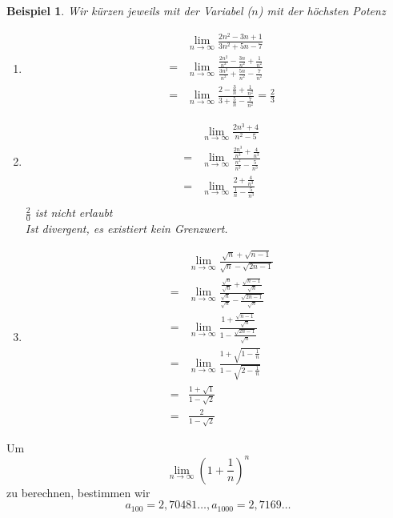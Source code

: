 \documentclass{report}
\newtheorem{myexample}{Beispiel}
\begin{document}
\newpage
\begin{myexample}Wir kürzen jeweils mit der Variabel ($n$) mit der höchsten Potenz
\begin{enumerate}
	\item 
	\begin{eqnarray*}
		&&\lim_{n \to \infty} \frac{2n^2-3n+1}{3n^2+5n-7} \\
		&=& \lim_{n \to \infty}\frac{\frac{2n^2}{n^2}-\frac{3n}{n^2}+\frac{1}{n^2}}{\frac{3n^2}{n^2}+\frac{5n}{n^2}-\frac{7}{n^2}} \\
		&=& \lim_{n \to \infty}\frac{2-\frac{3}{n}+\frac{1}{n^2}}{3+\frac{5}{n}-\frac{7}{n^2}} = \frac{2}{3}
	\end{eqnarray*}
	\item
	\begin{eqnarray*}
		&&\lim_{n \to \infty} \frac{2n^3+4}{n^2-5}\\
		&=&\lim_{n \to \infty} \frac{\frac{2n^3}{n^3}+ \frac{4}{n^3}}{\frac{n^2}{n^3}-\frac{5}{n^3}}\\
		&=&\lim_{n \to \infty} \frac{2+ \frac{4}{n^3}}{\frac{1}{n}-\frac{5}{n^3}}\\
	\end{eqnarray*}
	$\frac{2}{0}$ ist nicht erlaubt\\
	Ist divergent, es existiert kein Grenzwert. 
	\item \begin{eqnarray*}
	&&\lim_{n \to \infty}\frac{\sqrt{n}+\sqrt{n-1}}{\sqrt{n}-\sqrt{2n-1}} \\
	& = & \lim_{n \to \infty}\frac{\frac{\sqrt{n}}{\sqrt{n}}+\frac{\sqrt{n-1}}{\sqrt{n}}}{\frac{\sqrt{n}}{\sqrt{n}}-\frac{\sqrt{2n-1}}{\sqrt{n}}} \\
	&=& \lim_{n \to \infty}\frac{1+\frac{\sqrt{n-1}}{\sqrt{n}}}{1-\frac{\sqrt{2n-1}}{\sqrt{n}}} \nonumber \\
	&=& \lim_{n \to \infty}\frac{1+\sqrt{1-\frac{1}{n}}}{1-\sqrt{2-\frac{1}{n}}} \\
	&=& \frac{1+\sqrt{1}}{1-\sqrt{2}} \\
	&=& \frac{2}{1-\sqrt{2}}
	\end{eqnarray*}
\end{enumerate}\end{myexample}
\newpage
\noindent
Um
\begin{equation*}\lim_{n \to \infty} (1+\frac{1}{n})^n\end{equation*}
zu berechnen, bestimmen wir
\begin{equation*}a_{100} = 2,70481 \ldots, a_{1000} = 2,7169\ldots\end{equation*}
\end{document}
